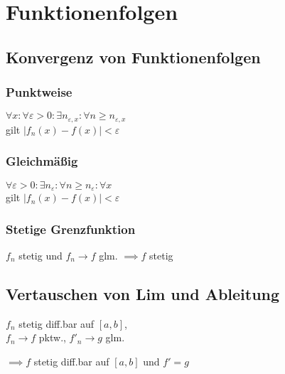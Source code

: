 \section*{Funktionenfolgen}

\subsection*{Konvergenz von Funktionenfolgen}

\subsubsection*{Punktweise}
$\forall x: \forall \varepsilon>0: \exists n_{\varepsilon,x}: \forall n\ge n_{\varepsilon,x}$ \\
gilt $|f_n(x)-f(x)|<\varepsilon$

\subsubsection*{Gleichmäßig}
$\forall \varepsilon>0: \exists n_\varepsilon: \forall n\ge n_\varepsilon: \forall x$ \\
gilt $|f_n(x)-f(x)|<\varepsilon$

\subsubsection*{Stetige Grenzfunktion}
$f_n$ stetig und $f_n \to f$ glm. $\implies f$ stetig

\subsection*{Vertauschen von Lim und Ableitung}
$f_n$ stetig diff.bar auf $[a,b]$,\\
$f_n\to f$ pktw., $f'_n\to g$ glm.

$\implies f$ stetig diff.bar auf $[a,b]$ und $f'=g$
